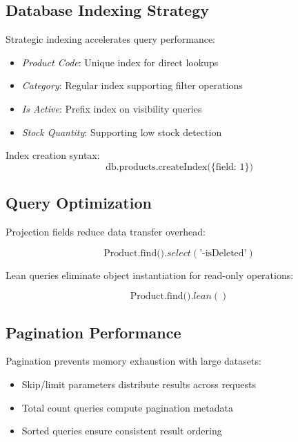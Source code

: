 \documentclass[conference]{IEEEtran}
\begin{document}
\subsection{Database Indexing Strategy}

Strategic indexing accelerates query performance:

\begin{itemize}
\item \textit{Product Code}: Unique index for direct lookups
\item \textit{Category}: Regular index supporting filter operations
\item \textit{Is Active}: Prefix index on visibility queries
\item \textit{Stock Quantity}: Supporting low stock detection
\end{itemize}

Index creation syntax:
\begin{equation}
\text{db.products.createIndex(\{field: 1\})}
\end{equation}

\subsection{Query Optimization}

Projection fields reduce data transfer overhead:

\begin{equation}
\text{Product.find()}.select(\text{'-isDeleted'})
\end{equation}

Lean queries eliminate object instantiation for read-only operations:

\begin{equation}
\text{Product.find()}.lean()
\end{equation}

\subsection{Pagination Performance}

Pagination prevents memory exhaustion with large datasets:

\begin{itemize}
\item Skip/limit parameters distribute results across requests
\item Total count queries compute pagination metadata
\item Sorted queries ensure consistent result ordering
\end{itemize}
\end{document}
